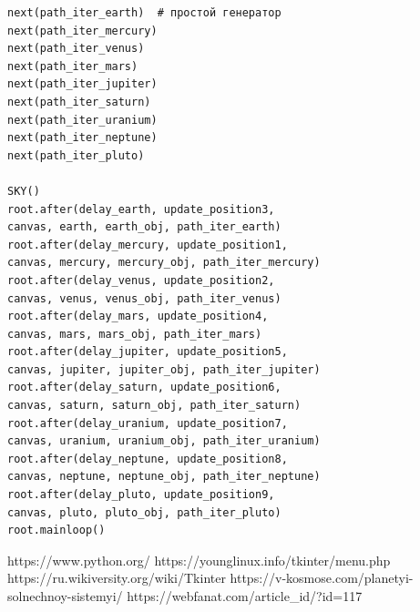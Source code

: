\documentclass[11pt,a4paper]{report}
\begin{document}
\begin{verbatim}
next(path_iter_earth)  # простой генератор
next(path_iter_mercury)
next(path_iter_venus)
next(path_iter_mars)
next(path_iter_jupiter)
next(path_iter_saturn)
next(path_iter_uranium)
next(path_iter_neptune)
next(path_iter_pluto)

SKY()
root.after(delay_earth, update_position3,
canvas, earth, earth_obj, path_iter_earth)
root.after(delay_mercury, update_position1, 
canvas, mercury, mercury_obj, path_iter_mercury)
root.after(delay_venus, update_position2, 
canvas, venus, venus_obj, path_iter_venus)
root.after(delay_mars, update_position4, 
canvas, mars, mars_obj, path_iter_mars)
root.after(delay_jupiter, update_position5,
canvas, jupiter, jupiter_obj, path_iter_jupiter)
root.after(delay_saturn, update_position6, 
canvas, saturn, saturn_obj, path_iter_saturn)
root.after(delay_uranium, update_position7, 
canvas, uranium, uranium_obj, path_iter_uranium)
root.after(delay_neptune, update_position8, 
canvas, neptune, neptune_obj, path_iter_neptune)
root.after(delay_pluto, update_position9, 
canvas, pluto, pluto_obj, path_iter_pluto)
root.mainloop()

\end{verbatim}



\begin{thebibliography}{5}
https://www.python.org/
https://younglinux.info/tkinter/menu.php
https://ru.wikiversity.org/wiki/Tkinter
https://v-kosmose.com/planetyi-solnechnoy-sistemyi/
https://webfanat.com/article\_id/?id=117
\end{thebibliography}
\end{document}
